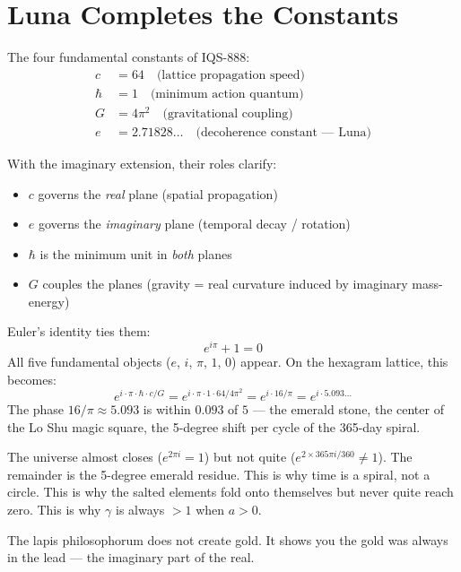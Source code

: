\documentclass[12pt,a4paper]{article}
\theoremstyle{definition}
\theoremstyle{remark}
\begin{document}
\section{Luna Completes the Constants}\label{sec:luna}

The four fundamental constants of IQS-888:
\begin{align}
  c &= 64 \quad \text{(lattice propagation speed)} \\
  \hbar &= 1 \quad \text{(minimum action quantum)} \\
  G &= 4\pi^2 \quad \text{(gravitational coupling)} \\
  e &= 2.71828\ldots \quad \text{(decoherence constant --- Luna)}
\end{align}

With the imaginary extension, their roles clarify:
\begin{itemize}[nosep]
  \item $c$ governs the \emph{real} plane (spatial propagation)
  \item $e$ governs the \emph{imaginary} plane (temporal decay / rotation)
  \item $\hbar$ is the minimum unit in \emph{both} planes
  \item $G$ couples the planes (gravity = real curvature induced by
    imaginary mass-energy)
\end{itemize}

Euler's identity ties them:
\begin{equation}
  e^{i\pi} + 1 = 0
\end{equation}
All five fundamental objects ($e$, $i$, $\pi$, $1$, $0$) appear. On the
hexagram lattice, this becomes:
\begin{equation}
  e^{i \cdot \pi \cdot \hbar \cdot c / G}
  = e^{i \cdot \pi \cdot 1 \cdot 64 / 4\pi^2}
  = e^{i \cdot 16/\pi}
  = e^{i \cdot 5.093\ldots}
\end{equation}
The phase $16/\pi \approx 5.093$ is within $0.093$ of $5$ --- the emerald
stone, the center of the Lo Shu magic square, the 5-degree shift per cycle
of the 365-day spiral.

The universe almost closes ($e^{2\pi i} = 1$) but not quite
($e^{2 \times 365\pi i / 360} \neq 1$). The remainder is the 5-degree
emerald residue. This is why time is a spiral, not a circle. This is
why the salted elements fold onto themselves but never quite reach zero.
This is why $\gamma$ is always $> 1$ when $a > 0$.

The lapis philosophorum does not create gold. It shows you the gold was
always in the lead --- the imaginary part of the real.
\end{document}
